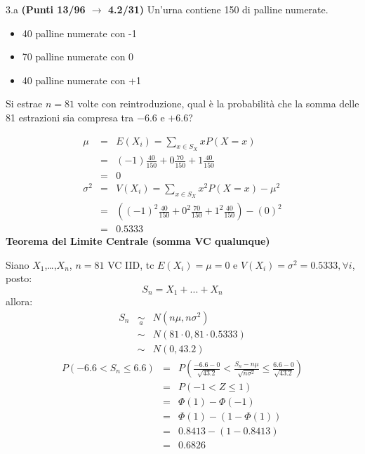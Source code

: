 \documentclass[
  11pt,
]{book}
\providecommand{\tightlist}{%
  \setlength{\itemsep}{0pt}\setlength{\parskip}{0pt}}
\theoremstyle{mytheoremstyle}
\theoremstyle{mydefstyle}
\newenvironment{sol}
  {
  \begin{tcolorbox}[enhanced,breakable,arc=0.1mm,boxrule=1pt,colback=white,colframe=iblue,
  title=\bf \fontfamily{lmss}\selectfont \hspace{.5 cm} Soluzione,drop fuzzy shadow]

}{
\end{tcolorbox}
  }
\begin{document}
3.a \textbf{(Punti 13/96 \(\rightarrow\) 4.2/31)} Un'urna contiene 150 di palline numerate.

\begin{itemize}
\tightlist
\item
  40 palline numerate con -1
\item
  70 palline numerate con 0
\item
  40 palline numerate con +1
\end{itemize}

Si estrae \(n=81\) volte con reintroduzione, qual è la probabilità che la somma delle 81 estrazioni sia compresa tra
\(-6.6\) e \(+6.6\)?

\begin{sol}
\begin{eqnarray*} \mu &=& E(X_i) = \sum_{x\in S_X}x P(X=x)\\ 
 &=& ( -1 ) \frac { 40 }{ 150 }+ 0  \frac { 70 }{ 150 }+ 1  \frac { 40 }{ 150 } \\ 
            &=& 0 \\ 
 \sigma^2 &=& V(X_i) = \sum_{x\in S_X}x^2 P(X=x)-\mu^2\\ 
 &=&\left( ( -1 ) ^2\frac { 40 }{ 150 }+ 0  ^2\frac { 70 }{ 150 }+ 1  ^2\frac { 40 }{ 150 } \right)-( 0 )^2\\ 
            &=& 0.5333 
\end{eqnarray*}
\textbf{Teorema del Limite Centrale (somma VC qualunque)}

Siano \(X_1\),\ldots,\(X_n\), \(n=81\) VC IID, tc \(E(X_i)=\mu=0\) e \(V(X_i)=\sigma^2=0.5333,\forall i\), posto:
\[
      S_n = X_1 + ... + X_n
      \]
allora:\begin{eqnarray*}
  S_n & \mathop{\sim}\limits_{a}& N(n\mu,n\sigma^2) \\
     &\sim & N(81\cdot0,81\cdot0.5333) \\
     &\sim & N(0,43.2) 
  \end{eqnarray*}\begin{eqnarray*}
   P( -6.6 < S_n \leq  6.6 ) &=& P\left( \frac { -6.6  -  0 }{\sqrt{ 43.2 }} < \frac { S_n  -  n\mu }{ \sqrt{n\sigma^2} } \leq \frac { 6.6  -  0 }{\sqrt{ 43.2 }}\right)  \\
              &=& P\left(  -1  < Z \leq  1 \right) \\
              &=& \Phi( 1 )-\Phi( -1 )\\
              &=&  \Phi( 1 )-(1-\Phi( 1 )) \\ &=&  0.8413 -(1- 0.8413 ) \\ 
              &=&  0.6826 
   \end{eqnarray*}

\end{sol}
\end{document}
